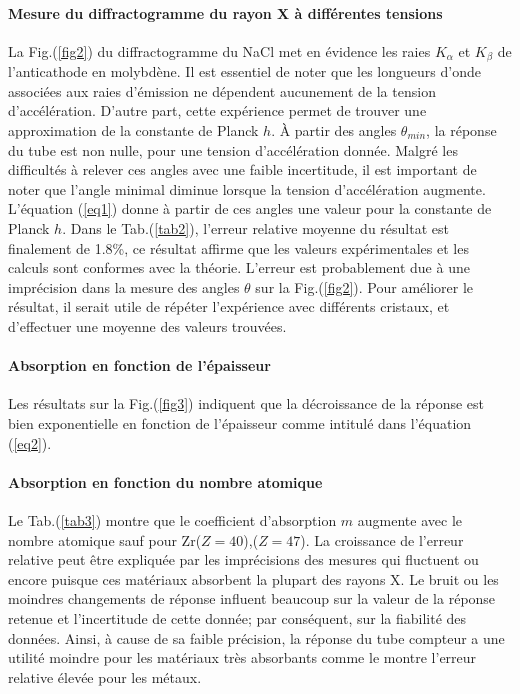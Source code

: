 \documentclass[a4paper, 12pt,oneside]{article}
\begin{document}
\paragraph{Mesure du diffractogramme du rayon X à différentes tensions}
La Fig.(\ref{fig2}) du diffractogramme du NaCl met en évidence les raies $K_\alpha$ et $K_\beta$ de l’anticathode en molybdène. Il est essentiel de noter que les longueurs d’onde associées aux raies d’émission ne dépendent aucunement de la tension d’accélération. D’autre part, cette expérience permet de trouver une approximation de la constante de Planck $h$. À partir des angles $\theta_{min}$, la réponse du tube est non nulle, pour une tension d'accélération donnée. Malgré les difficultés à relever ces angles avec une faible incertitude, il est important de noter que l'angle minimal diminue lorsque la tension d'accélération augmente. L'équation (\ref{eq1}) donne à partir de ces angles une valeur pour la constante de Planck $h$. Dans le Tab.(\ref{tab2}), l’erreur relative moyenne du résultat est finalement  de 1.8\%, ce résultat affirme que les valeurs expérimentales et les calculs sont conformes avec la théorie. L'erreur est probablement due à une imprécision dans la mesure des angles $\theta$ sur la Fig.(\ref{fig2}). Pour améliorer le résultat, il serait utile de répéter l'expérience avec différents cristaux, et d'effectuer une moyenne des valeurs trouvées.
\vspace{-0.35cm}
\paragraph{Absorption en fonction de l’épaisseur}
Les résultats sur la Fig.(\ref{fig3}) indiquent que la décroissance de la réponse est bien exponentielle en fonction de l’épaisseur comme intitulé dans l’équation (\ref{eq2}).
\vspace{-0.35cm}
\paragraph{Absorption en fonction du nombre atomique}
Le Tab.(\ref{tab3}) montre que le coefficient d’absorption $m$ augmente avec le nombre atomique sauf pour Zr($Z=40$),($Z=47$). La croissance de l'erreur relative peut être expliquée par les imprécisions des mesures qui fluctuent ou encore puisque ces matériaux absorbent la plupart des rayons X. Le bruit ou les moindres changements de réponse influent beaucoup sur la valeur de la réponse retenue et l'incertitude de cette donnée; par conséquent, sur la fiabilité des données. Ainsi, à cause de sa faible précision, la réponse du tube compteur a une utilité moindre pour les matériaux très absorbants comme le montre l'erreur relative élevée pour les métaux.
\vspace{-0.35cm}
\end{document}
